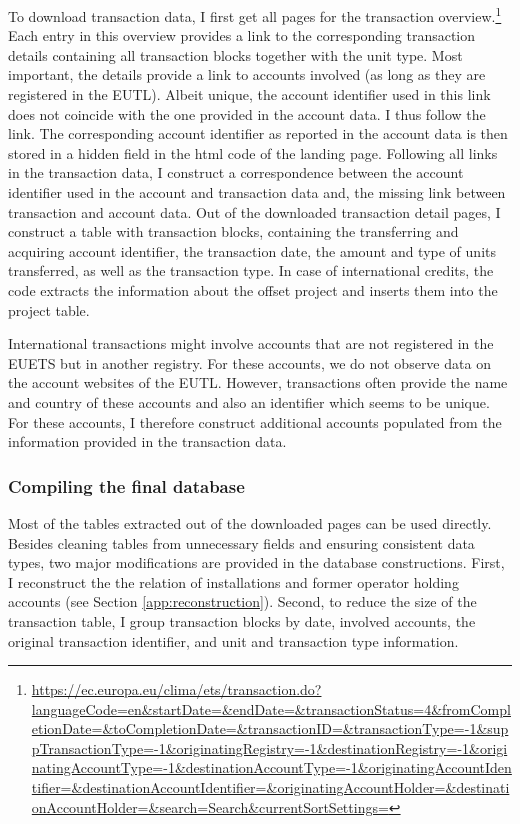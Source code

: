 \documentclass[authoryear]{elsarticle}
\begin{document}
To download transaction data, I first get all pages for the transaction overview.\footnote{\url{https://ec.europa.eu/clima/ets/transaction.do?languageCode=en&startDate=&endDate=&transactionStatus=4&fromCompletionDate=&toCompletionDate=&transactionID=&transactionType=-1&suppTransactionType=-1&originatingRegistry=-1&destinationRegistry=-1&originatingAccountType=-1&destinationAccountType=-1&originatingAccountIdentifier=&destinationAccountIdentifier=&originatingAccountHolder=&destinationAccountHolder=&search=Search&currentSortSettings=}} Each entry in this overview provides a link to the corresponding transaction details containing all transaction blocks together with the unit type. Most important, the details provide a link to accounts involved (as long as they are registered in the EUTL). Albeit unique, the account identifier used in this link does not coincide with the one provided in the account data. I thus follow the link. The corresponding account identifier as reported in the account data is then stored in a hidden field in the html code of the landing page. Following all links in the transaction data, I construct a correspondence between the account identifier used in the account and transaction data and, the missing link between transaction and account data. Out of the downloaded transaction detail pages, I construct a table with transaction blocks, containing the transferring and acquiring account identifier, the transaction date, the amount and type of units transferred, as well as the transaction type. In case of international credits, the code extracts the information about the offset project and inserts them into the project table. 

International transactions might involve accounts that are not registered in the EUETS but in another registry. For these accounts, we do not observe data on the account websites of the EUTL. However, transactions often provide the name and country of these accounts and also an identifier which seems to be unique. For these accounts, I therefore construct additional accounts populated from the information provided in the transaction data. 

\subsubsection{Compiling the final database}

Most of the tables extracted out of the downloaded pages can be used directly. Besides cleaning tables from unnecessary fields and ensuring consistent data types, two major modifications are provided in the database constructions. First, I reconstruct the the relation of installations and former operator holding accounts (see Section \ref{app:reconstruction}). Second, to reduce the size of the transaction table, I group transaction blocks by date, involved accounts, the original transaction identifier, and unit and transaction type information.
\end{document}
